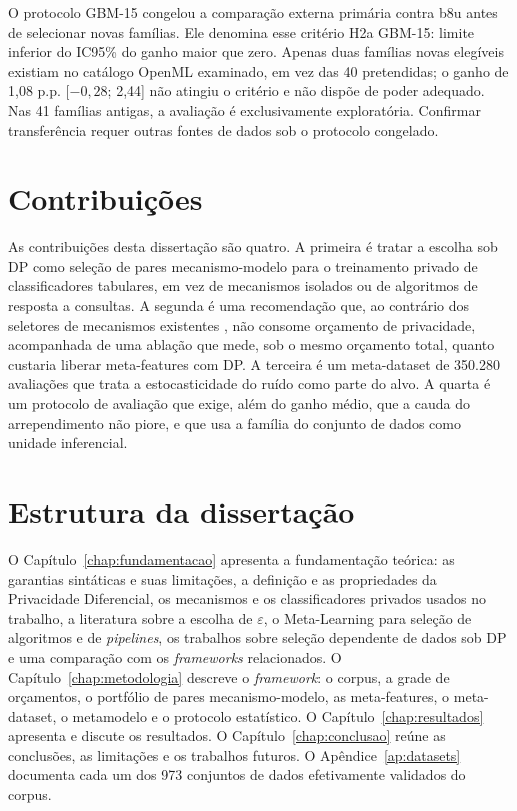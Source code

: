 O protocolo GBM-15 congelou a comparação externa primária contra b8u antes de selecionar novas famílias. Ele denomina esse critério H2a GBM-15: limite inferior do IC95\% do ganho maior que zero. Apenas duas famílias novas elegíveis existiam no catálogo OpenML examinado, em vez das 40 pretendidas; o ganho de 1,08 p.p. [$-0,28$; 2,44] não atingiu o critério e não dispõe de poder adequado. Nas 41 famílias antigas, a avaliação é exclusivamente exploratória. Confirmar transferência requer outras fontes de dados sob o protocolo congelado.

\section{Contribuições}
\label{sec:contribuicoes}

As contribuições desta dissertação são quatro. A primeira é tratar a escolha sob DP como seleção de pares mecanismo-modelo para o treinamento privado de classificadores tabulares, em vez de mecanismos isolados ou de algoritmos de resposta a consultas. A segunda é uma recomendação que, ao contrário dos seletores de mecanismos existentes \cite{ref35}, não consome orçamento de privacidade, acompanhada de uma ablação que mede, sob o mesmo orçamento total, quanto custaria liberar meta-features com DP. A terceira é um meta-dataset de 350.280 avaliações que trata a estocasticidade do ruído como parte do alvo. A quarta é um protocolo de avaliação que exige, além do ganho médio, que a cauda do arrependimento não piore, e que usa a família do conjunto de dados como unidade inferencial.

\section{Estrutura da dissertação}
\label{sec:estrutura}

O Capítulo~\ref{chap:fundamentacao} apresenta a fundamentação teórica: as garantias sintáticas e suas limitações, a definição e as propriedades da Privacidade Diferencial, os mecanismos e os classificadores privados usados no trabalho, a literatura sobre a escolha de $\varepsilon$, o Meta-Learning para seleção de algoritmos e de \textit{pipelines}, os trabalhos sobre seleção dependente de dados sob DP e uma comparação com os \textit{frameworks} relacionados. O Capítulo~\ref{chap:metodologia} descreve o \textit{framework}: o corpus, a grade de orçamentos, o portfólio de pares mecanismo-modelo, as meta-features, o meta-dataset, o metamodelo e o protocolo estatístico. O Capítulo~\ref{chap:resultados} apresenta e discute os resultados. O Capítulo~\ref{chap:conclusao} reúne as conclusões, as limitações e os trabalhos futuros. O Apêndice~\ref{ap:datasets} documenta cada um dos 973 conjuntos de dados efetivamente validados do corpus.
